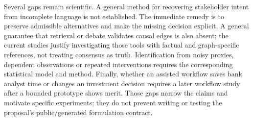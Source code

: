 Several gaps remain scientific. A general method for recovering
stakeholder intent from incomplete language is not established. The
immediate remedy is to preserve admissible alternatives and make the
missing decision explicit. A general guarantee that retrieval or debate
validates causal edges is also absent; the current studies justify
investigating those tools with factual and graph-specific references,
not treating consensus as truth. Identification from noisy proxies,
dependent observations or repeated interventions requires the
corresponding statistical model and method. Finally, whether an assisted
workflow saves bank analyst time or changes an investment decision
requires a later workflow study after a bounded prototype shows merit.
Those gaps narrow the claims and motivate specific experiments; they do
not prevent writing or testing the proposal's public/generated
formulation contract. \label{exec13:formulation-end}
